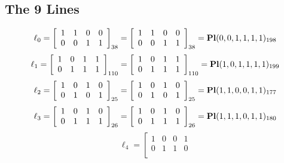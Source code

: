 \documentclass{article}
\begin{document}
{\subsection*{The 9 Lines}
$$
\ell_{0} = 
\left[
\begin{array}{*{4}{r}}
1 & 1 & 0 & 0\\
0 & 0 & 1 & 1\\
\end{array}
\right]
_{38}
=
\left[
\begin{array}{*{4}c}
1  & 1  & 0  & 0\\
0  & 0  & 1  & 1\\
\end{array}
\right]_{38}
={\rm\bf Pl}(0,0,1,1,1,1 )_{198}$$
$$
\ell_{1} = 
\left[
\begin{array}{*{4}{r}}
1 & 0 & 1 & 1\\
0 & 1 & 1 & 1\\
\end{array}
\right]
_{110}
=
\left[
\begin{array}{*{4}c}
1  & 0  & 1  & 1\\
0  & 1  & 1  & 1\\
\end{array}
\right]_{110}
={\rm\bf Pl}(1,0,1,1,1,1 )_{199}$$
$$
\ell_{2} = 
\left[
\begin{array}{*{4}{r}}
1 & 0 & 1 & 0\\
0 & 1 & 0 & 1\\
\end{array}
\right]
_{25}
=
\left[
\begin{array}{*{4}c}
1  & 0  & 1  & 0\\
0  & 1  & 0  & 1\\
\end{array}
\right]_{25}
={\rm\bf Pl}(1,1,0,0,1,1 )_{177}$$
$$
\ell_{3} = 
\left[
\begin{array}{*{4}{r}}
1 & 0 & 1 & 0\\
0 & 1 & 1 & 1\\
\end{array}
\right]
_{26}
=
\left[
\begin{array}{*{4}c}
1  & 0  & 1  & 0\\
0  & 1  & 1  & 1\\
\end{array}
\right]_{26}
={\rm\bf Pl}(1,1,1,0,1,1 )_{180}$$
$$
\ell_{4} = 
\left[
\begin{array}{*{4}{r}}
1 & 0 & 0 & 1\\
0 & 1 & 1 & 0\\
\end{array}
$$}
\end{document}
